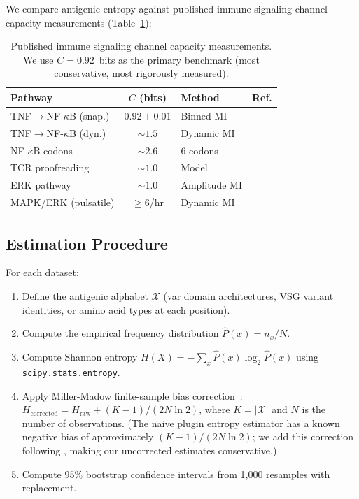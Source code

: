 \documentclass[twocolumn,10pt]{article}
\begin{document}
We compare antigenic entropy against published immune signaling channel capacity measurements (Table~\ref{tab:benchmarks}):

\begin{table}[t]
\centering
\caption{Published immune signaling channel capacity measurements.  We use $C = 0.92$~bits as the primary benchmark (most conservative, most rigorously measured).}
\label{tab:benchmarks}
\footnotesize
\begin{tabular}{@{}lclc@{}}
\toprule
Pathway & $C$ (bits) & Method & Ref. \\
\midrule
TNF$\to$NF-$\kappa$B (snap.) & $0.92 \pm 0.01$ & Binned MI & \footnotesize{\citeyear{cheong2011}} \\
TNF$\to$NF-$\kappa$B (dyn.) & ${\sim}1.5$ & Dynamic MI & \footnotesize{\citeyear{selimkhanov2014}} \\
NF-$\kappa$B codons & ${\sim}2.6$ & 6 codons & \footnotesize{\citeyear{adelaja2021}} \\
TCR proofreading & ${\sim}1.0$ & Model & \footnotesize{\citeyear{ganti2020}} \\
ERK pathway & ${\sim}1.0$ & Amplitude MI & \footnotesize{\citeyear{uda2013}} \\
MAPK/ERK (pulsatile) & ${\geq}6$/hr & Dynamic MI & \footnotesize{\citeyear{nalecz2023}} \\
\bottomrule
\end{tabular}
\end{table}

\subsection{Estimation Procedure}

For each dataset:
\begin{enumerate}
\item Define the antigenic alphabet $\mathcal{X}$ (var domain architectures, VSG variant identities, or amino acid types at each position).
\item Compute the empirical frequency distribution $\hat{P}(x) = n_x / N$.
\item Compute Shannon entropy $H(X) = -\sum_x \hat{P}(x) \log_2 \hat{P}(x)$ using \texttt{scipy.stats.entropy}.
\item Apply Miller-Madow finite-sample bias correction~\citep{miller1955}: $H_{\text{corrected}} = H_{\text{raw}} + (K-1)/(2N\ln 2)$, where $K = |\mathcal{X}|$ and $N$ is the number of observations.  (The naive plugin entropy estimator has a known negative bias of approximately $(K-1)/(2N\ln 2)$; we add this correction following \citealt{miller1955}, making our uncorrected estimates conservative.)
\item Compute 95\% bootstrap confidence intervals from 1,000 resamples with replacement.
\end{enumerate}
\end{document}
